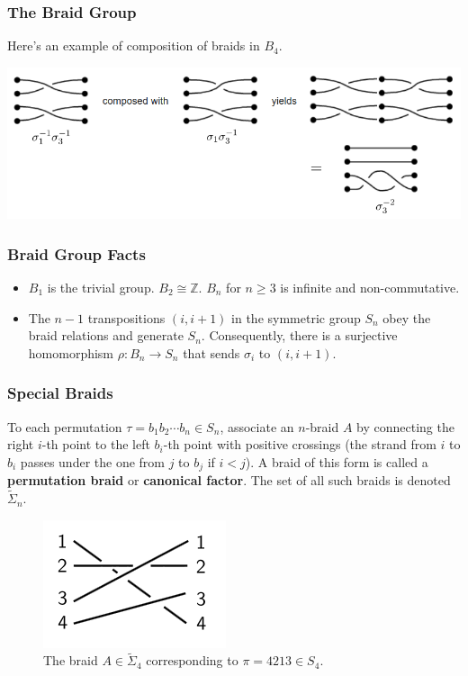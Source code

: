 \documentclass{beamer}
\newcommand{\integers}{\mathbb{Z}}
\begin{document}
\begin{frame}
	\frametitle{The Braid Group}
	\begin{example}
		Here's an example of composition of braids in $B_4$.
	\end{example}\pause
	\vfill
	\centering
	\includegraphics[scale=.5]{composition.png}
\end{frame}

\begin{frame}
	\frametitle{Braid Group Facts}
	\begin{itemize}
		\item $B_1$ is the trivial group. $B_2 \cong \integers$. $B_n$ for $n\geq 3$ is infinite and non-commutative.\pause
		\item The $n-1$ transpositions $(i, i+1)$ in the symmetric group $S_n$ obey the braid relations and generate $S_n$. Consequently, there is a surjective homomorphism $\rho: B_n\to S_n$ that sends $\sigma_i$ to $(i, i+1)$.
	\end{itemize}
\end{frame}

\begin{frame}
	\frametitle{Special Braids}
	\begin{definition}
		To each permutation $\tau = b_1b_2\cdots b_n\in S_n$, associate an $n$-braid $A$ by connecting the right $i$-th point to the left $b_i$-th point with positive crossings (the strand from $i$ to $b_i$ passes under the one from $j$ to $b_j$ if $i<j$). A braid of this form is called a \textbf{permutation braid} or \textbf{canonical factor}. The set of all such braids is denoted $\tilde{\Sigma}_n$.
	\end{definition}\pause
	\vfill
	\begin{figure}[h]
		\centering
		\includegraphics[scale=.7]{permutation.png}
		\caption{The braid $A\in \tilde{\Sigma}_4$ corresponding to $\pi = 4213\in S_4$.}
	\end{figure}
\end{frame}
\end{document}
